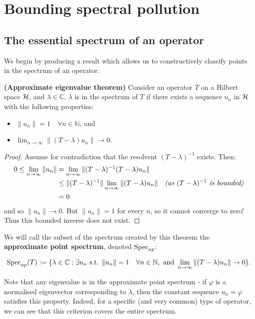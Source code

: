 \documentclass[../main.tex]{subfiles}
\begin{document}
\section{Bounding spectral pollution}\label{chapter:bounds}

\subsection{The essential spectrum of an operator}\label{sec:ess-spec}

We begin by producing a result which allows us to constructively classify points in the spectrum of an operator.
\begin{theorem}{\textbf{(Approximate eigenvalue theorem)}}\label{thm:approx-eigenvalue-thm}
Consider an operator $T$ on a Hilbert space $\mathcal{H}$, and $\lambda \in \mathbb{C}$. $\lambda$ is in the spectrum of $T$ if there exists a sequence $u_n$ in $\mathcal{H}$ with the following properties:
\begin{itemize}
\item $\|u_n\| = 1\quad \forall n \in \mathbb{N}$, and
\item $\lim_{n \rightarrow \infty}\|(T - \lambda)u_n\|  \rightarrow 0$.
\end{itemize}
\end{theorem}
\begin{proof}
Assume for contradiction that the resolvent $(T - \lambda)^{-1}$ exists. Then:
\begin{align*}
0 \leq \lim_{n \rightarrow \infty} \|u_n\| & = \lim_{n \rightarrow \infty} \|(T - \lambda)^{-1}(T - \lambda)u_n\| & \\
& \leq \|(T - \lambda)^{-1}\| \lim_{n \rightarrow \infty} \|(T - \lambda)u_n\| & \text{\emph{(as $(T - \lambda)^{-1}$ is bounded)}}\\
& = 0
\end{align*}
and so $\|u_n\| \rightarrow 0$. But $\|u_n\| = 1$ for every $n$, so it cannot converge to zero! Thus this bounded inverse does not exist.
\end{proof}
We will call the subset of the spectrum created by this theorem the \textbf{approximate point spectrum}, denoted $\mathrm{Spec}_{ap}$:

$$\mathrm{Spec}_{ap}(T) \mathrel{\mathop:}= \{ \lambda \in \mathbb{C} : \exists u_n \text{ s.t. } \|u_n\| = 1\quad \forall n \in \mathbb{N},\text{ and }\lim_{n \rightarrow \infty}\|(T - \lambda)u_n\|  \rightarrow 0\}.$$

Note that any eigenvalue is in the approximate point spectrum - if $\varphi$ is a normalised eigenvector corresponding to $\lambda$, then the constant
sequence $u_n = \varphi$ satisfies this property. Indeed, for a specific (and very common) type of operator, we can see that this criterion covers the
entire spectrum.
\end{document}
